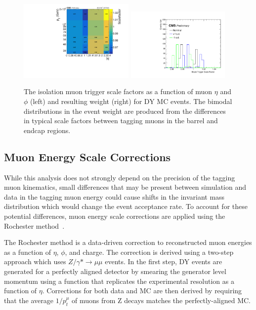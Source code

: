 \begin{figure}[htbp]
	\centering
	\includegraphics[width=0.5\textwidth]{figures/muTrigEff_2018.pdf}
        \hspace{0.01\textwidth}
        \includegraphics[width=0.45\textwidth]{figures/trigSF.pdf}
	\caption[Muon Trigger Scale Factors and Weights]{The isolation muon trigger scale factors as a function of muon $\eta$ and $\phi$ (left) and resulting weight (right) for DY MC events. The bimodal distributions in the event weight are produced from the differences in typical scale factors between tagging muons in the barrel and endcap regions.}
        \label{fig:muTrigSFs}
\end{figure}

\subsection{Muon Energy Scale Corrections}
While this analysis does not strongly depend on the precision of the tagging muon kinematics, small differences that may be present between simulation and data in the tagging muon energy could cause shifts in the invariant mass distribution which would change the event acceptance rate.
To account for these potential differences, muon energy scale corrections are applied using the Rochester method~\cite{rochester_corr}.

The Rochester method is a data-driven correction to reconstructed muon energies as a function of $\eta$, $\phi$, and charge.
The correction is derived using a two-step approach which uses $Z/\gamma* \rightarrow \mu\mu$ events.
In the first step, DY events are generated for a perfectly aligned detector by smearing the generator level momentum using a function that replicates the experimental resolution as a function of $\eta$. 
Corrections for both data and MC are then derived by requiring that the average $1/p_t^\mu$ of muons from Z decays matches the perfectly-aligned MC.

